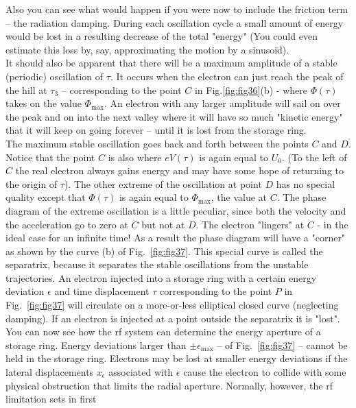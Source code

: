 Also you can see what would happen if you were now to include the friction term -- the radiation
 damping. During each oscillation cycle a small amount of energy would be lost in a resulting decrease of the total "energy" (You could even estimate this loss by, say, approximating the motion by a sinusoid).\\
It should also be apparent that there will be a maximum amplitude of a stable (periodic) oscillation of $\tau$. It occurs when the electron can just reach the peak of the hill at $\tau_3$ -- corresponding to the point $C$ in Fig.\ref{fig:fig36}(b) - where $\Phi(\tau)$ takes on the value $\Phi_\text{max}$. An electron with any larger amplitude will sail on over the peak
and on into the next valley where it will have so much "kinetic energy" that it will keep on going forever -- until it is lost from the storage ring.\\
The maximum stable oscillation goes back and forth between the points $C$ and $D$. Notice that the point $C$ is also where $eV(\tau)$ is again equal to $U_0$. (To the left of $C$ the real electron always gains energy and may have some hope of returning to the origin of $\tau$). The other extreme of the oscillation at point $D$ has no special quality except that $\Phi(\tau)$ is again equal to $\Phi_\text{max}$, the value at $C$. The phase diagram of the extreme oscillation
 is a little peculiar, since both the velocity and the acceleration go to zero at $C$ but not at $D$.  The electron "lingers" at $C$ - in the ideal case for an infinite time! As a result the phase diagram will have a "corner" as shown by the curve (b) of Fig.~\ref{fig:fig37}. This special curve is called the separatrix, because it separates the stable oscillations from the unstable trajectories. An electron injected into a storage ring with a certain energy deviation $\epsilon$ and time displacement $\tau$ corresponding to the point $P$ in Fig.~\ref{fig:fig37} will circulate on a more-or-less elliptical closed curve (neglecting damping). If an electron is injected at a point outside the separatrix it is "lost".\\
 You can now see how the rf system can determine the energy aperture of a storage ring. Energy deviations larger than $\pm\epsilon_\text{max}$ -- of Fig.~\ref{fig:fig37} -- cannot be held in the storage ring. Electrons may be lost at smaller energy deviations if the lateral displacements
 $x_\epsilon$ associated with $\epsilon$ cause the electron to collide with some physical obstruction that limits the radial aperture. Normally, however, the rf limitation sets in first

